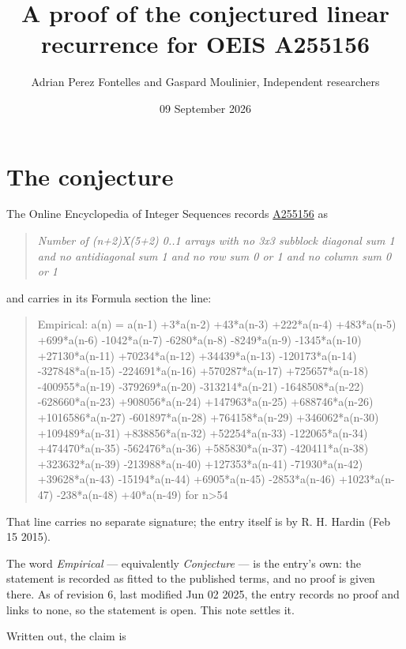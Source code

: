\documentclass[11pt]{article}
\title{A proof of the conjectured linear recurrence for OEIS A255156}
\author{Adrian Perez Fontelles and Gaspard Moulinier, Independent researchers}
\date{09 September 2026}
\theoremstyle{definition}
\begin{document}
\maketitle
\section{The conjecture}

The Online Encyclopedia of Integer Sequences records \href{https://oeis.org/A255156}{A255156} as

\begin{quote}\itshape Number of (n+2)X(5+2) 0..1 arrays with no 3x3 subblock diagonal sum 1 and no antidiagonal sum 1 and no row sum 0 or 1 and no column sum 0 or 1\end{quote}

and carries in its Formula section the line:

\begin{quote}\ttfamily Empirical: a(n) = a(n-1) +3*a(n-2) +43*a(n-3) +222*a(n-4) +483*a(n-5) +699*a(n-6) -1042*a(n-7) -6280*a(n-8) -8249*a(n-9) -1345*a(n-10) +27130*a(n-11) +70234*a(n-12) +34439*a(n-13) -120173*a(n-14) -327848*a(n-15) -224691*a(n-16) +570287*a(n-17) +725657*a(n-18) -400955*a(n-19) -379269*a(n-20) -313214*a(n-21) -1648508*a(n-22) -628660*a(n-23) +908056*a(n-24) +147963*a(n-25) +688746*a(n-26) +1016586*a(n-27) -601897*a(n-28) +764158*a(n-29) +346062*a(n-30) +109489*a(n-31) +838856*a(n-32) +52254*a(n-33) -122065*a(n-34) +474470*a(n-35) -562476*a(n-36) +585830*a(n-37) -420411*a(n-38) +323632*a(n-39) -213988*a(n-40) +127353*a(n-41) -71930*a(n-42) +39628*a(n-43) -15194*a(n-44) +6905*a(n-45) -2853*a(n-46) +1023*a(n-47) -238*a(n-48) +40*a(n-49) for n>54\end{quote}

That line carries no separate signature; the entry itself is by R. H. Hardin (Feb 15 2015).

The word {\itshape Empirical} --- equivalently {\itshape Conjecture} --- is the entry's own: the statement is recorded as fitted to the published terms, and no proof is given there. As of revision 6, last modified Jun 02 2025, the entry records no proof and links to none, so the statement is open. This note settles it.

Written out, the claim is
\end{document}
